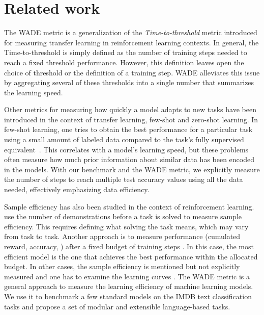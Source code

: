 \section{Related work}
The \ac{WADE} metric is a generalization of the \emph{Time-to-threshold} metric
\parencite{taylorCrossdomainTransferReinforcement2007,
  taylorTransferLearningInterTask2007} introduced for measuring transfer
learning in reinforcement learning contexts. In general, the Time-to-threshold
is simply defined as the number of training steps needed to reach a fixed
threshold performance. However, this definition leaves open the choice of
threshold or the definition of a training step. \ac{WADE} alleviates this issue
by aggregating several of these thresholds into a single number that summarizes
the learning speed.

Other metrics for measuring how quickly a model adapts to new tasks have been
introduced in the context of transfer learning, few-shot and zero-shot learning.
In few-shot learning, one tries to obtain the best performance for a particular
task using a small amount of labeled data compared to the task's fully
supervised equivalent~\parencite{wangGeneralizingFewExamples2020}. This correlates
with a model's learning speed, but these problems often measure how much prior
information about similar data has been encoded in the models. With our
benchmark and the \ac{WADE} metric, we explicitly measure the number of steps to reach
multiple test accuracy values using all the data needed, effectively emphasizing
data efficiency.

Sample efficiency has also been studied in the context of
reinforcement learning. \parencite{chevalier-boisvertBabyaiPlatformStudy2018} use the
number of demonstrations before a task is solved to measure sample efficiency.
This requires defining what solving the task means, which may vary from task to
task. Another approach is to measure performance (cumulated reward, accuracy,
\etc) after a fixed budget of training steps
\parencite{yaratsImprovingSampleEfficiency2019}. In this case, the most efficient
model is the one that achieves the best performance within the allocated budget.
In other cases, the sample efficiency is mentioned but not explicitly measured
and one has to examine the learning curves
\parencite{buckmanSampleefficientReinforcementLearning2018}. The \ac{WADE} metric is
a general approach to measure the learning efficiency of machine learning
models. We use it to benchmark a few standard models on the IMDB text
classification tasks \parencite{maasLearningWordVectors2011} and propose a set of
modular and extensible language-based tasks.

